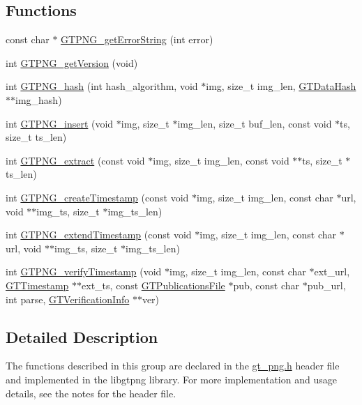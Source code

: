 \subsection*{Functions}
\begin{DoxyCompactItemize}
\item 
const char $\ast$ \hyperlink{group__png_ga6627f66b5eff92e2259d0e06f2790502}{GTPNG\_\-getErrorString} (int error)
\item 
int \hyperlink{group__png_ga912eedbe157a29e9b1b40d7438ccf7d4}{GTPNG\_\-getVersion} (void)
\item 
int \hyperlink{group__png_gad55b2f8d7d57cc8810515058d3c05f33}{GTPNG\_\-hash} (int hash\_\-algorithm, void $\ast$img, size\_\-t img\_\-len, \hyperlink{struct_g_t_message_digest__st}{GTDataHash} $\ast$$\ast$img\_\-hash)
\item 
int \hyperlink{group__png_gaa61d36d3d1f3a285c25a577c077329a7}{GTPNG\_\-insert} (void $\ast$img, size\_\-t $\ast$img\_\-len, size\_\-t buf\_\-len, const void $\ast$ts, size\_\-t ts\_\-len)
\item 
int \hyperlink{group__png_ga0b290532190c3733d699af7c6cbbcd84}{GTPNG\_\-extract} (const void $\ast$img, size\_\-t img\_\-len, const void $\ast$$\ast$ts, size\_\-t $\ast$ts\_\-len)
\item 
int \hyperlink{group__png_gaa51ff47232930fe430e37cf13162e588}{GTPNG\_\-createTimestamp} (const void $\ast$img, size\_\-t img\_\-len, const char $\ast$url, void $\ast$$\ast$img\_\-ts, size\_\-t $\ast$img\_\-ts\_\-len)
\item 
int \hyperlink{group__png_ga529cb12b6beca769df8fe306c22e7ab5}{GTPNG\_\-extendTimestamp} (const void $\ast$img, size\_\-t img\_\-len, const char $\ast$url, void $\ast$$\ast$img\_\-ts, size\_\-t $\ast$img\_\-ts\_\-len)
\item 
int \hyperlink{group__png_gaafa094593caab313f2d19188beefeb57}{GTPNG\_\-verifyTimestamp} (void $\ast$img, size\_\-t img\_\-len, const char $\ast$ext\_\-url, \hyperlink{group__timestamps_gaddb792efe52216386853c94e7aeaf6ba}{GTTimestamp} $\ast$$\ast$ext\_\-ts, const \hyperlink{group__publications_gacf561fdbce4067eb94bd9761a71e7e5a}{GTPublicationsFile} $\ast$pub, const char $\ast$pub\_\-url, int parse, \hyperlink{struct_g_t_verification_info__st}{GTVerificationInfo} $\ast$$\ast$ver)
\end{DoxyCompactItemize}


\subsection{Detailed Description}
The functions described in this group are declared in the {\ttfamily \hyperlink{gt__png_8h}{gt\_\-png.h}} header file and implemented in the {\ttfamily libgtpng} library. For more implementation and usage details, see the notes for the header file.

